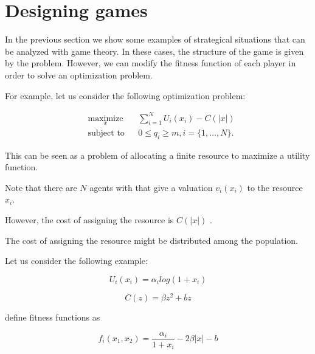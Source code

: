\documentclass[a4paper,10pt]{article}
\begin{document}
\section{Designing games}

In the previous section we show some examples of strategical situations that can be analyzed with game theory. In these cases, the structure of the game is given by the problem. However, we can modify the fitness function of each player in order to solve an optimization problem.

For example, let us consider the following optimization problem:

\begin{equation}\label{eq:opt_problem}
\begin{aligned}
& \underset{x}{\text{maximize}} 
& & \sum_{i=1}^N U_i(x_i)  - C(|x|)\\
& \text{subject to}
& & 0 \leq q_i \geq m,  i =\{1,\ldots, N\}.
\end{aligned}
\end{equation}

This can be seen as a problem of allocating a finite resource to maximize a utility function. 

Note that there are $N$ agents with that give a valuation $v_i(x_i)$ to the resource $x_i$.

However, the cost of assigning the resource is $C(|x|)$ .

The cost of assigning the resource might be distributed among the population. 

Let us consider the following example:


\begin{equation}
U_i(x_i) =   \alpha_i  log(1+x_i) 
\end{equation}

\begin{equation}
C(z) = \beta z^2 + b z 
\end{equation}

define fitness functions as 

\begin{equation}
f_i(x_1, x_2) = \frac{\alpha_i}{1+x_i} - 2 \beta |x| - b 
\end{equation}

\end{document}
